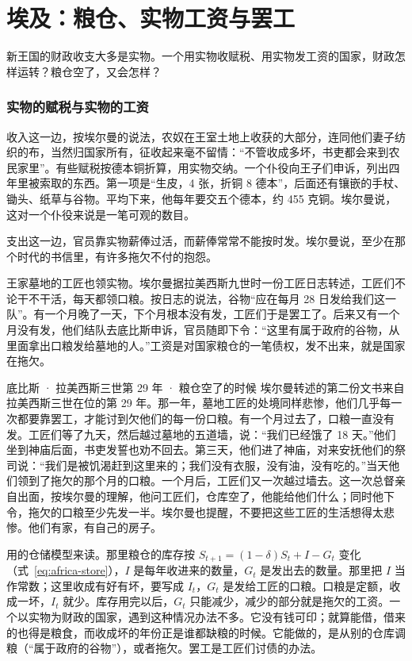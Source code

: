 \section{埃及：粮仓、实物工资与罢工}\label{sec:meso-egypt}

新王国的财政收支大多是实物。一个用实物收赋税、用实物发工资的国家，财政怎样运转？粮仓空了，又会怎样？

\subsubsection{实物的赋税与实物的工资}
收入这一边，按埃尔曼的说法，农奴在王室土地上收获的大部分，连同他们妻子纺织的布，当然归国家所有，征收起来毫不留情：“不管收成多坏，书吏都会来到农民家里”\cite{erman1894}。有些赋税按德本铜折算，用实物交纳。一个仆役向王子们申诉，列出四年里被索取的东西。第一项是“生皮，4 张，折铜 8 德本”，后面还有镶嵌的手杖、锄头、纸草与谷物。平均下来，他每年要交五个德本，约 455 克铜。埃尔曼说，这对一个仆役来说是一笔可观的数目\cite{erman1894}。

支出这一边，官员靠实物薪俸过活，而薪俸常常不能按时发。埃尔曼说，至少在那个时代的书信里，有许多拖欠不付的抱怨\cite{erman1894}。

王家墓地的工匠也领实物。埃尔曼据拉美西斯九世时一份工匠日志转述，工匠们不论干不干活，每天都领口粮。按日志的说法，谷物“应在每月 28 日发给我们这一队”。有一个月晚了一天，下个月根本没有发，工匠们于是罢工了。后来又有一个月没有发，他们结队去底比斯申诉，官员随即下令：“这里有属于政府的谷物，从里面拿出口粮发给墓地的人。”\cite{erman1894}工资是对国家粮仓的一笔债权，发不出来，就是国家在拖欠。

\begin{case}{底比斯 · 拉美西斯三世第 29 年 · 粮仓空了的时候}
埃尔曼转述的第二份文书来自拉美西斯三世在位的第 29 年。那一年，墓地工匠的处境同样悲惨，他们几乎每一次都要靠罢工，才能讨到欠他们的每一份口粮\cite{erman1894}。有一个月过去了，口粮一直没有发。工匠们等了九天，然后越过墓地的五道墙，说：“我们已经饿了 18 天。”他们坐到神庙后面，书吏发誓也劝不回去。第三天，他们进了神庙，对来安抚他们的祭司说：“我们是被饥渴赶到这里来的；我们没有衣服，没有油，没有吃的。”\cite{erman1894}当天他们领到了拖欠的那个月的口粮。一个月后，工匠们又一次越过墙去。这一次总督亲自出面，按埃尔曼的理解，他问工匠们，仓库空了，他能给他们什么；同时他下令，拖欠的口粮至少先发一半\cite{erman1894}。埃尔曼也提醒，不要把这些工匠的生活想得太悲惨。他们有家，有自己的房子\cite{erman1894}。

用的仓储模型来读。那里粮仓的库存按 $S_{t+1}=(1-\delta)S_t+I-G_t$ 变化（式~\eqref{eq:africa-store}），$I$ 是每年收进来的数量，$G_t$ 是发出去的数量。那里把 $I$ 当作常数；这里收成有好有坏，要写成 $I_t$，$G_t$ 是发给工匠的口粮。口粮是定额，收成一坏，$I_t$ 就少。库存用完以后，$G_t$ 只能减少，减少的部分就是拖欠的工资。一个以实物为财政的国家，遇到这种情况办法不多。它没有钱可印；就算能借，借来的也得是粮食，而收成坏的年份正是谁都缺粮的时候。它能做的，是从别的仓库调粮（“属于政府的谷物”），或者拖欠。罢工是工匠们讨债的办法。
\end{case}

